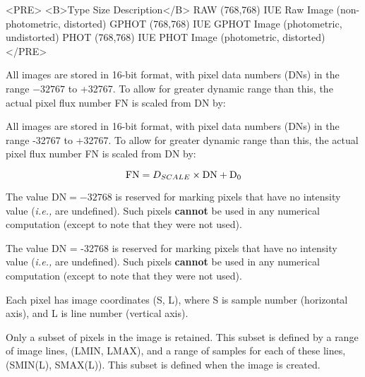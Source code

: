 \begin{htmlonly}
\begin{rawhtml}
<PRE>
<B>Type     Size        Description</B>
RAW      (768,768)   IUE Raw Image (non-photometric, distorted)
GPHOT    (768,768)   IUE GPHOT Image (photometric, undistorted)
PHOT     (768,768)   IUE PHOT Image (photometric, distorted)
</PRE>
\end{rawhtml}
\end{htmlonly}

\begin{latexonly}
All images are stored in 16-bit format, with pixel data numbers (DNs) in the
range $-32767$ to +32767.  To allow for greater dynamic range than this, the
actual pixel flux number FN is scaled from DN by:
\end{latexonly}

\begin{htmlonly}
All images are stored in 16-bit format, with pixel data numbers (DNs) in the
range -32767 to +32767.  To allow for greater dynamic range than this, the
actual pixel flux number FN is scaled from DN by:
\end{htmlonly}

\begin{displaymath}
{\rm FN} = D_{SCALE} \times {\rm DN} + {\rm D}_{0}
\end{displaymath}

\begin{latexonly}
The value DN$ = -32768$ is reserved for marking pixels that have no
intensity value ({\it{i.e.,}}  are undefined)\@.  Such pixels {\bf cannot} be
used in any numerical computation (except to note that they were not used)\@.
\end{latexonly}

\begin{htmlonly}
The value DN = -32768 is reserved for marking pixels that have no
intensity value ({\it{i.e.,}}  are undefined)\@.  Such pixels {\bf cannot} be
used in any numerical computation (except to note that they were not used)\@.
\end{htmlonly}

Each pixel has image coordinates (S, L), where S is sample number (horizontal
axis), and L is line number (vertical axis)\@.

Only a subset of pixels in the image is retained.  This subset is defined by a
range of image lines, (LMIN, LMAX), and a range of samples for each of these
lines, (SMIN(L), SMAX(L))\@.  This subset is defined when the image is created.

